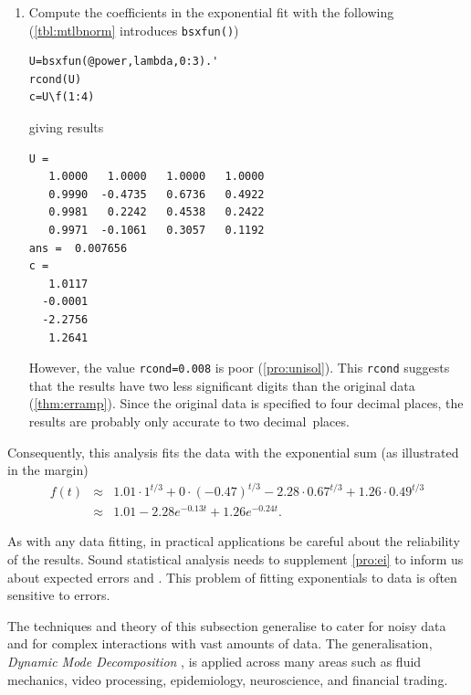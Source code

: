 \begin{example}
\begin{solution}
\begin{enumerate}
\item Compute the coefficients in the exponential fit with the following (\autoref{tbl:mtlbnorm} introduces \verb|bsxfun()|)
\begin{verbatim}
U=bsxfun(@power,lambda,0:3).'
rcond(U)
c=U\f(1:4)
\end{verbatim}
giving results
\begin{verbatim}
U =
   1.0000   1.0000   1.0000   1.0000
   0.9990  -0.4735   0.6736   0.4922
   0.9981   0.2242   0.4538   0.2422
   0.9971  -0.1061   0.3057   0.1192
ans =  0.007656
c =
   1.0117
  -0.0001
  -2.2756
   1.2641
\end{verbatim}
However, the value \verb|rcond=0.008| is poor (\autoref{pro:unisol}).
This \verb|rcond| suggests that the results have two less significant digits than the original data (\autoref{thm:erramp}).
Since the original data is specified to four decimal places, the results are probably only accurate to two decimal~places.
\end{enumerate}
Consequently, this analysis fits the data with the exponential sum (as illustrated in the margin)
%
\begin{eqnarray*}
f(t)&\approx&1.01\cdot1^{t/3}+0\cdot(-0.47)^{t/3}
-2.28\cdot0.67^{t/3}+1.26\cdot0.49^{t/3}
\\&\approx&1.01-2.28e^{-0.13t}+1.26e^{-0.24t}.
\end{eqnarray*}
\end{solution}
\end{example}


As with any data fitting, in practical applications be careful about the reliability of the results.
Sound statistical analysis needs to supplement \autoref{pro:ei} to inform us about expected errors and .
This problem of fitting exponentials to data is often sensitive to errors.

The techniques and theory of this subsection generalise to cater for noisy data and for complex  interactions with vast amounts of data.
The generalisation, \emph{Dynamic Mode Decomposition} \cite[e.g.]{Kutz2016}, is applied across many areas such as fluid mechanics, video processing, epidemiology, neuroscience, and financial trading.











